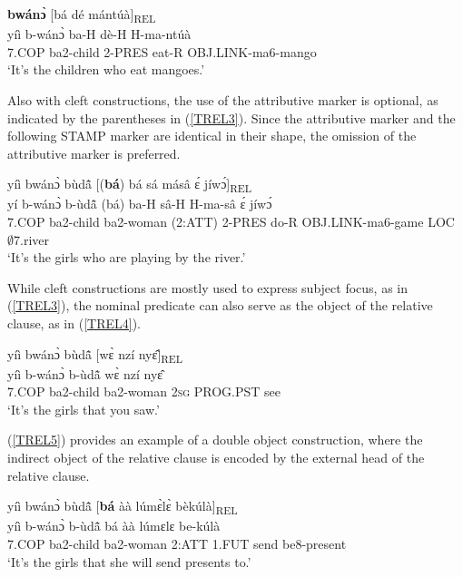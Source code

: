 \begin{exe}
\ex\label{cleft1}
   {\bfseries bwánɔ̀} [bá dé mántúà]\textsubscript{REL} \\
        yíì b-wánɔ̀ ba-H dè-H H-ma-ntúà  \\
          7.COP ba2-child 2-PRES eat-R OBJ.LINK-ma6-mango  \\ 
    \trans `It's the children who eat mangoes.'
\end{exe}

Also with cleft constructions, the use of the attributive marker is optional, as indicated by the parentheses in (\ref{TREL3}). Since the attributive marker and the following STAMP marker are identical in their shape, the omission of the attributive marker is preferred.

\begin{exe}
\ex\label{TREL3} 
  \glll yíì bwánɔ̀ bùdã̂ [({\bfseries bá}) bá sá másâ ɛ́ jíwɔ́]\textsubscript{REL} \\
         yí b-wánɔ̀ b-ùdã̂ (bá) ba-H sâ-H H-ma-sâ ɛ́ jíwɔ́ \\
         7.COP ba2-child ba2-woman (2:ATT) 2-PRES do-R OBJ.LINK-ma6-game LOC $\emptyset$7.river  \\ 
    \trans `It's the girls who are playing by the river.'
\end{exe}

\noindent While cleft constructions are mostly used to express subject focus, as in (\ref{TREL3}), the nominal predicate can also serve as the object of the relative clause, as in (\ref{TREL4}).

\begin{exe}
\ex\label{TREL4} 
  \glll yíì bwánɔ̀ bùdã̂ [wɛ̀ nzí nyɛ̂]\textsubscript{REL} \\
         yíì b-wánɔ̀ b-ùdã̂ wɛ̀ nzí nyɛ̂ \\
         7.COP ba2-child ba2-woman 2\textsc{sg} PROG.PST see  \\ 
    \trans `It's the girls that you saw.'
\end{exe}

\noindent (\ref{TREL5}) provides an example of a double object construction, where the indirect object of the relative clause is encoded by the external head of the relative clause.

\begin{exe}
\ex\label{TREL5} 
  \glll yíì bwánɔ̀ bùdã̂ [{\bfseries bá} àà lúmɛ̀lɛ̀ bèkúlà]\textsubscript{REL} \\
         yíì b-wánɔ̀ b-ùdã̂ bá àà lúmɛlɛ be-kúlà \\
         7.COP ba2-child ba2-woman 2:ATT 1.FUT send be8-present \\ 
    \trans `It's the girls that she will send presents to.'
\end{exe}

